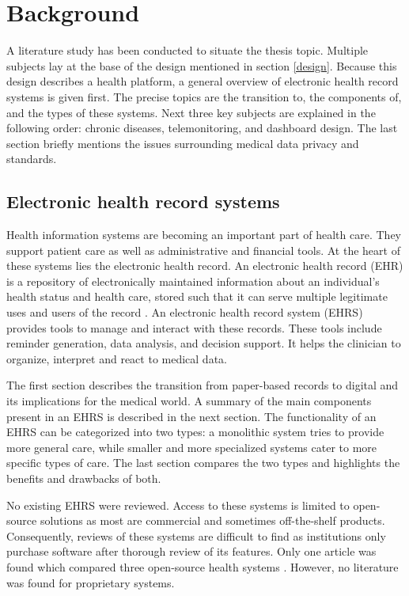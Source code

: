 \section{Background} \label{background}

A literature study has been conducted to situate the thesis topic. Multiple subjects lay at the base of the design mentioned in section \ref{design}. Because this design describes a health platform, a general overview of electronic health record systems is given first. The precise topics are the transition to, the components of, and the types of these systems. Next three key subjects are explained in the following order: chronic diseases, telemonitoring, and dashboard design. The last section briefly mentions the issues surrounding medical data privacy and standards. 

    \subsection{Electronic health record systems}

    Health information systems are becoming an important part of health care. They support patient care as well as administrative and financial tools. At the heart of these systems lies the electronic health record. An electronic health record (EHR) is a repository of electronically maintained information about an individual's health status and health care, stored such that it can serve multiple legitimate uses and users of the record \cite{biomedical_informatics}. An electronic health record system (EHRS) provides tools to manage and interact with these records. These tools include reminder generation, data analysis, and decision support. It helps the clinician to organize, interpret and react to medical data.

    The first section describes the transition from paper-based records to digital and its implications for the medical world. A summary of the main components present in an EHRS is described in the next section. The functionality of an EHRS can be categorized into two types: a monolithic system tries to provide more general care, while smaller and more specialized systems cater to more specific types of care. The last section compares the two types and highlights the benefits and drawbacks of both.

    No existing EHRS were reviewed. Access to these systems is limited to open-source solutions as most are commercial and sometimes off-the-shelf products. Consequently, reviews of these systems are difficult to find as institutions only purchase software after thorough review of its features. Only one article was found which compared three open-source health systems \cite{de2012overview}. However, no literature was found for proprietary systems.

